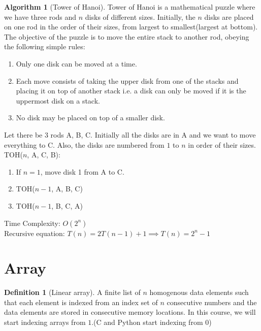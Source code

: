 \documentclass[10pt, a4paper]{extarticle}
\theoremstyle{definition}
\newtheorem{alg}{Algorithm}
\newtheorem{defn}{Definition}
\begin{document}
\begin{alg}[Tower of Hanoi]
	Tower of Hanoi is a mathematical puzzle where we have three rods and $n$ disks of different sizes. Initially, the $n$ disks are placed on one rod in the order of their sizes, from largest to smallest(largest at bottom). The objective of the puzzle is to move the entire stack to another rod, obeying the following simple rules:
	\begin{enumerate}
		\item Only one disk can be moved at a time.
		\item Each move consists of taking the upper disk from one of the stacks and placing it on top of another stack i.e. a disk can only be moved if it is the uppermost disk on a stack.
		\item No disk may be placed on top of a smaller disk.
	\end{enumerate}
	Let there be $3$ rods A, B, C. Initially all the disks are in A and we want to move everything to C. Also, the disks are numbered from $1$ to $n$ in order of their sizes.\\
	TOH($n$, A, C, B):
	\begin{enumerate}
		\item If $n=1$, move disk 1 from A to C.
		\item TOH($n-1$, A, B, C)
		\item TOH($n-1$, B, C, A)
	\end{enumerate}
	Time Complexity: $O(2^n)$\\
	Recursive equation: $T(n)=2T(n-1)+1\implies T(n)=2^n-1$
\end{alg}

\section{Array}
\begin{defn}[Linear array]
	A finite list of $n$ homogenous data elements such that each element is indexed from an index set of $n$ consecutive numbers and the data elements are stored in consecutive memory locations.
	In this course, we will start indexing arrays from $1$.(C and Python start indexing from 0)
\end{defn}
\end{document}
